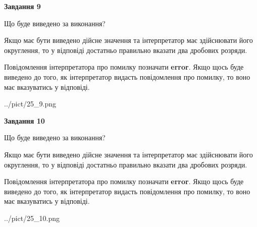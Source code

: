 \documentclass[12pt, ukrainian]{article}
\begin{document}
{\begin {Large}
{\begin {center}\textbf{Завдання 9}\end {center}}\par
Що буде виведено за виконання? \par

Якщо має бути виведено дійсне значення та інтерпретатор має здійснювати його округлення, 
то у відповіді достатньо правильно вказати два дробових розряди.

Повідомлення інтерпретатора про помилку позначати \textbf{error}.
Якщо щось буде виведено до того, як інтерпретатор видасть повідомлення про помилку, 
то воно має вказуватись у відповіді. \par

\begin{center}
	{../pict/25_9.png}
\end{center}
\newpage

{\begin {center}\textbf{Завдання 10}\end {center}}\par
Що буде виведено за виконання? \par

Якщо має бути виведено дійсне значення та інтерпретатор має здійснювати його округлення, 
то у відповіді достатньо правильно вказати два дробових розряди.

Повідомлення інтерпретатора про помилку позначати \textbf{error}.
Якщо щось буде виведено до того, як інтерпретатор видасть повідомлення про помилку, 
то воно має вказуватись у відповіді. \par

\begin{center}
	{../pict/25_10.png}
\end{center}
\newpage

\end {Large}}
\end{document}
